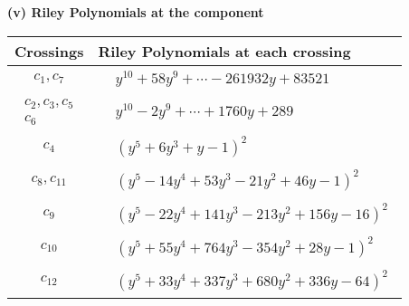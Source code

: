 \documentclass[1p]{elsarticle_modified}
\theoremstyle{definition}
\begin{document}
\newpage\renewcommand{\arraystretch}{1}
\flushleft \textbf{(v) Riley Polynomials at the component}\newline \\
\begin{tabular}{m{50pt}|m{274pt}}
Crossings & \hspace{64pt}Riley Polynomials at each crossing \\
\hline $$\begin{aligned}c_{1},c_{7}\end{aligned}$$&$\begin{aligned}
&y^{10}+58 y^9+\cdots-261932 y+83521
\end{aligned}$\\
\hline $$\begin{aligned}c_{2},c_{3},c_{5}\\c_{6}\end{aligned}$$&$\begin{aligned}
&y^{10}-2 y^9+\cdots+1760 y+289
\end{aligned}$\\
\hline $$\begin{aligned}c_{4}\end{aligned}$$&$\begin{aligned}
&(y^5+6 y^3+y-1)^2
\end{aligned}$\\
\hline $$\begin{aligned}c_{8},c_{11}\end{aligned}$$&$\begin{aligned}
&(y^5-14 y^4+53 y^3-21 y^2+46 y-1)^2
\end{aligned}$\\
\hline $$\begin{aligned}c_{9}\end{aligned}$$&$\begin{aligned}
&(y^5-22 y^4+141 y^3-213 y^2+156 y-16)^2
\end{aligned}$\\
\hline $$\begin{aligned}c_{10}\end{aligned}$$&$\begin{aligned}
&(y^5+55 y^4+764 y^3-354 y^2+28 y-1)^2
\end{aligned}$\\
\hline $$\begin{aligned}c_{12}\end{aligned}$$&$\begin{aligned}
&(y^5+33 y^4+337 y^3+680 y^2+336 y-64)^2
\end{aligned}$\\
\hline
\end{tabular}\\~\\
\end{document}

